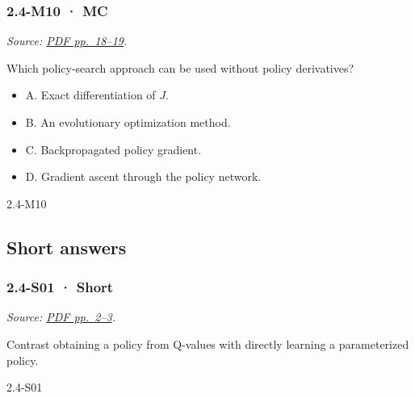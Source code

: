 \noindent\begin{minipage}{\linewidth}

\subsubsection{2.4-M10 · MC}\label{m10-mc-6}

\emph{Source:
\href{../Lecture\%20Slides/2.4.\%20Policy\%20Search.pdf\#page=18}{PDF
pp.~18--19}.}

Which policy-search approach can be used without policy derivatives?

\begin{itemize}
\tightlist
\item
  A. Exact differentiation of \(J\).
\item
  B. An evolutionary optimization method.
\item
  C. Backpropagated policy gradient.
\item
  D. Gradient ascent through the policy network.
\end{itemize}

\begin{solution}[8mm]{2.4-M10}

\end{solution}
\end{minipage}\par\medskip

\subsection{Short answers}\label{short-answers-6}

\noindent\begin{minipage}{\linewidth}

\subsubsection{2.4-S01 · Short}\label{s01-short-6}

\emph{Source:
\href{../Lecture\%20Slides/2.4.\%20Policy\%20Search.pdf\#page=2}{PDF
pp.~2--3}.}

Contrast obtaining a policy from Q-values with directly learning a
parameterized policy.

\begin{solution}[20mm]{2.4-S01}

\end{solution}
\end{minipage}\par\medskip

